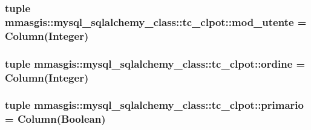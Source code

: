 \label{classmmasgis_1_1mysql__sqlalchemy__class_1_1tc__clpot_a85d1660bc9c9eeea9986432a63a903f5}
\hypertarget{classmmasgis_1_1mysql__sqlalchemy__class_1_1tc__clpot_a26d341800ed44ff88493e1b9581b2bf4}{
\subsubsection[{mod\_\-utente}]{\setlength{\rightskip}{0pt plus 5cm}tuple {\bf mmasgis::mysql\_\-sqlalchemy\_\-class::tc\_\-clpot::mod\_\-utente} = Column(Integer)}}
\label{classmmasgis_1_1mysql__sqlalchemy__class_1_1tc__clpot_a26d341800ed44ff88493e1b9581b2bf4}
\hypertarget{classmmasgis_1_1mysql__sqlalchemy__class_1_1tc__clpot_a64b5d2e94029c8b18367f74eb734168d}{
\subsubsection[{ordine}]{\setlength{\rightskip}{0pt plus 5cm}tuple {\bf mmasgis::mysql\_\-sqlalchemy\_\-class::tc\_\-clpot::ordine} = Column(Integer)}}
\label{classmmasgis_1_1mysql__sqlalchemy__class_1_1tc__clpot_a64b5d2e94029c8b18367f74eb734168d}
\hypertarget{classmmasgis_1_1mysql__sqlalchemy__class_1_1tc__clpot_ac0055b8df65d6ef59351db566e18d122}{
\subsubsection[{primario}]{\setlength{\rightskip}{0pt plus 5cm}tuple {\bf mmasgis::mysql\_\-sqlalchemy\_\-class::tc\_\-clpot::primario} = Column(Boolean)}}
\label{classmmasgis_1_1mysql__sqlalchemy__class_1_1tc__clpot_ac0055b8df65d6ef59351db566e18d122}
